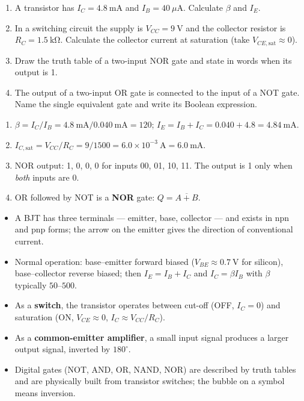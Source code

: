 \documentclass[11pt]{article}
\begin{document}
\begin{exercice}
\begin{enumerate}
\item A transistor has $I_C = 4.8\ \mathrm{mA}$ and $I_B = 40\ \mu\mathrm{A}$. Calculate $\beta$ and $I_E$.
\item In a switching circuit the supply is $V_{CC} = 9\ \mathrm{V}$ and the collector resistor is $R_C = 1.5\ \mathrm{k\Omega}$. Calculate the collector current at saturation (take $V_{CE,\mathrm{sat}} \approx 0$).
\item Draw the truth table of a two-input NOR gate and state in words when its output is 1.
\item The output of a two-input OR gate is connected to the input of a NOT gate. Name the single equivalent gate and write its Boolean expression.
\end{enumerate}
\end{exercice}

\begin{corrige}[Exercise 1]
\begin{enumerate}
\item $\beta = I_C / I_B = 4.8\ \mathrm{mA} / 0.040\ \mathrm{mA} = 120$; $I_E = I_B + I_C = 0.040 + 4.8 = 4.84\ \mathrm{mA}$.
\item $I_{C,\mathrm{sat}} = V_{CC}/R_C = 9 / 1500 = 6.0\times 10^{-3}\ \mathrm{A} = 6.0\ \mathrm{mA}$.
\item NOR output: 1, 0, 0, 0 for inputs 00, 01, 10, 11. The output is 1 only when \emph{both} inputs are 0.
\item OR followed by NOT is a \textbf{NOR} gate: $Q = \overline{A + B}$.
\end{enumerate}
\end{corrige}

\begin{aretenir}
\begin{itemize}
\item A BJT has three terminals --- emitter, base, collector --- and exists in npn and pnp forms; the arrow on the emitter gives the direction of conventional current.
\item Normal operation: base--emitter forward biased ($V_{BE} \approx 0.7\ \mathrm{V}$ for silicon), base--collector reverse biased; then $I_E = I_B + I_C$ and $I_C = \beta I_B$ with $\beta$ typically $50$--$500$.
\item As a \textbf{switch}, the transistor operates between cut-off (OFF, $I_C = 0$) and saturation (ON, $V_{CE} \approx 0$, $I_C \approx V_{CC}/R_C$).
\item As a \textbf{common-emitter amplifier}, a small input signal produces a larger output signal, inverted by $180^\circ$.
\item Digital gates (NOT, AND, OR, NAND, NOR) are described by truth tables and are physically built from transistor switches; the bubble on a symbol means inversion.
\end{itemize}
\end{aretenir}
\end{document}
